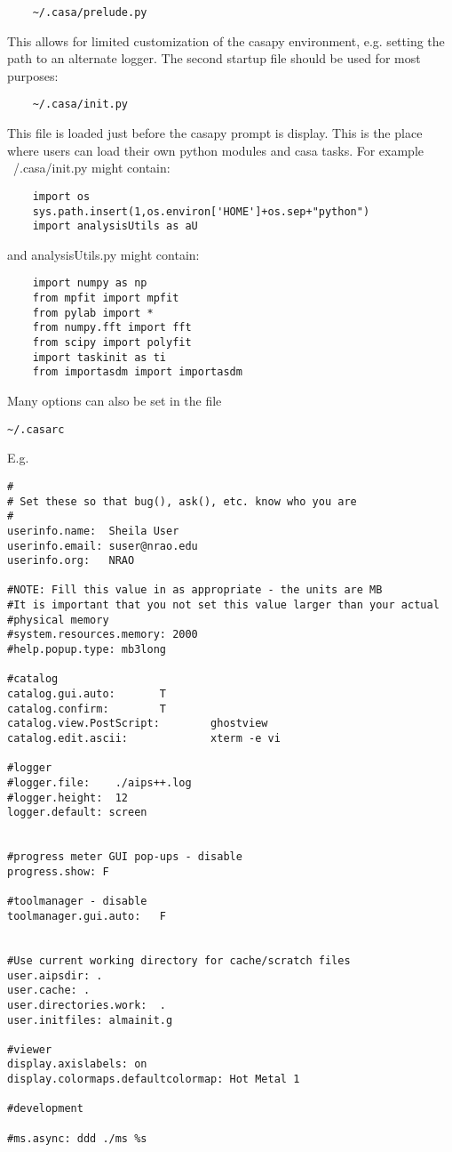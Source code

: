 \small
\begin{verbatim}
	~/.casa/prelude.py
\end{verbatim}
\normalsize

This allows for limited customization of the casapy environment,
e.g. setting the path to an alternate logger. The second startup file
should be used for most purposes:

\small
\begin{verbatim}
	~/.casa/init.py
\end{verbatim}
\normalsize

This file is loaded just before the casapy prompt is display. This is
the place where users can load their own python modules and casa
tasks. For example ~/.casa/init.py might contain:

\small
\begin{verbatim}
	import os
	sys.path.insert(1,os.environ['HOME']+os.sep+"python")
	import analysisUtils as aU
\end{verbatim}
\normalsize

and analysisUtils.py might contain:

\small
\begin{verbatim}
	import numpy as np
	from mpfit import mpfit
	from pylab import *
	from numpy.fft import fft
	from scipy import polyfit
	import taskinit as ti
	from importasdm import importasdm
 \end{verbatim}
\normalsize


Many options can also be set in the file 


\small
\begin{verbatim}
~/.casarc
\end{verbatim}
\normalsize

E.g. 

\small
\begin{verbatim}
#
# Set these so that bug(), ask(), etc. know who you are
#
userinfo.name:  Sheila User
userinfo.email: suser@nrao.edu
userinfo.org:   NRAO

#NOTE: Fill this value in as appropriate - the units are MB
#It is important that you not set this value larger than your actual
#physical memory
#system.resources.memory: 2000
#help.popup.type: mb3long

#catalog
catalog.gui.auto:       T
catalog.confirm:        T
catalog.view.PostScript:        ghostview
catalog.edit.ascii:             xterm -e vi

#logger
#logger.file:    ./aips++.log
#logger.height:  12
logger.default: screen


#progress meter GUI pop-ups - disable
progress.show: F

#toolmanager - disable
toolmanager.gui.auto:   F


#Use current working directory for cache/scratch files
user.aipsdir: .
user.cache: .
user.directories.work:  .
user.initfiles: almainit.g

#viewer
display.axislabels: on
display.colormaps.defaultcolormap: Hot Metal 1

#development

#ms.async: ddd ./ms %s
\end{verbatim}
\normalsize



